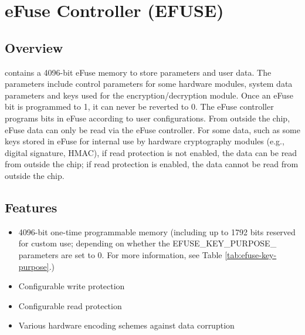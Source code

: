 \documentclass[main\_\_EN.tex]{subfiles}
\begin{document}

\ifglobal
\else
    \listoftodos
    {\let\clearpage\relax \listofdonetodos}
    \tableofcontents
\fi



\hypertarget{efuse}{}
\chapter{eFuse Controller (EFUSE)}
\label{mod:efuse}

\section{Overview}

\chipname{} contains a 4096-bit eFuse memory to store parameters and user data. The parameters include control parameters for some hardware modules, system data parameters and keys used for the encryption/decryption module. Once an eFuse bit is programmed to 1, it can never be reverted to 0. The eFuse controller programs bits in eFuse according to user configurations. From outside the chip, eFuse data can only be read via the eFuse controller. For some data, such as some keys stored in eFuse for internal use by hardware cryptography modules (e.g., digital signature, HMAC), if read protection is not enabled, the data can be read from outside the chip; if read protection is enabled, the data cannot be read from outside the chip.


\section{Features}

\begin{itemize}
    \item 4096-bit one-time programmable memory (including up to 1792 bits reserved for custom use; depending on whether the EFUSE\_KEY\_PURPOSE\_ parameters are set to 0. For more information, see Table \ref{tab:efuse-key-purpose}.)
    \item Configurable write protection
    \item Configurable read protection
    \item Various hardware encoding schemes against data corruption
\end{itemize}
\end{document}
